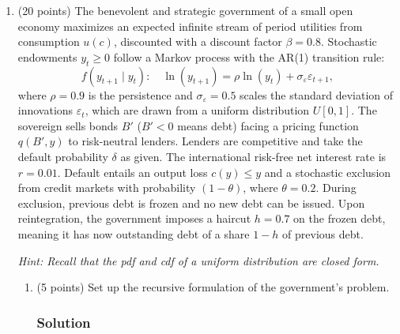 \documentclass[12pt]{article}
\begin{document}
\begin{enumerate}
    \newpage 
    \item (20 points) The benevolent and strategic government of a small open economy maximizes an expected infinite stream of period utilities from consumption $u(c)$, discounted with a discount factor $\beta = 0.8$. Stochastic endowments $y_t \geq 0$ follow a Markov process with the AR(1) transition rule:
    \[
    f(y_{t+1} \mid y_t): \quad \ln(y_{t+1}) = \rho \ln(y_t) + \sigma_\varepsilon \varepsilon_{t+1},
    \]
    where $\rho = 0.9$ is the persistence and $\sigma_\varepsilon = 0.5$ scales the standard deviation of innovations $\varepsilon_t$, which are drawn from a uniform distribution $U[0, 1]$. The sovereign sells bonds $B'$ ($B' < 0$ means debt) facing a pricing function $q(B', y)$ to risk-neutral lenders. Lenders are competitive and take the default probability $\delta$ as given. The international risk-free net interest rate is $r = 0.01$. Default entails an output loss $c(y) \leq y$ and a stochastic exclusion from credit markets with probability $(1 - \theta)$, where $\theta = 0.2$. During exclusion, previous debt is frozen and no new debt can be issued. Upon reintegration, the government imposes a haircut $h = 0.7$ on the frozen debt, meaning it has now outstanding debt of a share $1 - h$ of previous debt. 

    \textit{Hint: Recall that the pdf and cdf of a uniform distribution are closed form.}

    \begin{enumerate}%
        \item (5 points) Set up the recursive formulation of the government’s problem.
        \subsubsection*{Solution}


\end{enumerate}
\end{enumerate}
\end{document}
